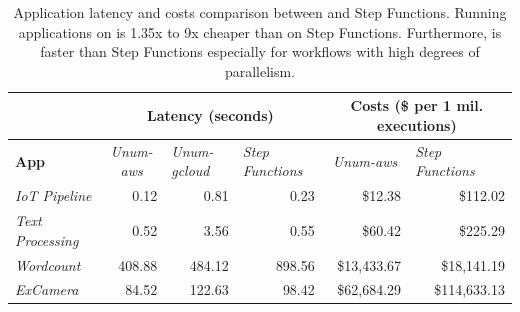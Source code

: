 \begin{table}[t]
  \centering
  \begin{tabular}{|l|rrr|rr|}
\hline
                         & \multicolumn{3}{c|}{\textbf{Latency (seconds)}}                    & \multicolumn{2}{c|}{\textbf{Costs (\$ per 1 mil. executions)}} \\ \hline
\textbf{App} &
  \multicolumn{1}{c|}{\textit{Unum-aws}} &
  \multicolumn{1}{l|}{\textit{Unum-gcloud}} &
  \multicolumn{1}{l|}{\textit{Step Functions}} &
  \multicolumn{1}{c|}{\textit{Unum-aws}} &
  \multicolumn{1}{l|}{\textit{Step Functions}} \\ \hline
\textit{IoT Pipeline}    & \multicolumn{1}{r|}{0.12}   & \multicolumn{1}{r|}{0.81}   & 0.23   & \multicolumn{1}{r|}{\$12.38}             & \$112.02            \\ \hline
\textit{Text Processing} & \multicolumn{1}{r|}{0.52}   & \multicolumn{1}{r|}{3.56}   & 0.55   & \multicolumn{1}{r|}{\$60.42}             & \$225.29            \\ \hline
\textit{Wordcount}       & \multicolumn{1}{r|}{408.88} & \multicolumn{1}{r|}{484.12} & 898.56 & \multicolumn{1}{r|}{\$13,433.67}         & \$18,141.19         \\ \hline
\textit{ExCamera}        & \multicolumn{1}{r|}{84.52}  & \multicolumn{1}{r|}{122.63} & 98.42  & \multicolumn{1}{r|}{\$62,684.29}         & \$114,633.13        \\ \hline
\end{tabular}
  \caption{Application latency and costs comparison between \name{} and Step
    Functions. Running applications on \name{} is 1.35x to 9x cheaper than
    on Step Functions. Furthermore, \name{} is faster than Step Functions
    especially for workflows with high degrees of parallelism.}
  \label{table:macro}
\end{table}

